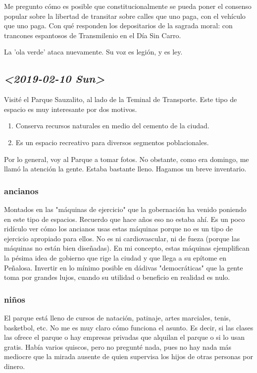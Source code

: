 \documentclass[11pt]{article}
\begin{document}
Me pregunto cómo es
posible que constitucionalmente se pueda poner el consenso popular sobre la libertad de transitar sobre calles que uno paga, con el vehículo 
que uno paga. Con qué responden los depositarios de la sagrada moral: con trancones espantosos de Transmilenio en el Día Sin Carro.

La 'ola verde' ataca nuevamente. Su voz es legión, y es ley.





\subsection{\textit{<2019-02-10 Sun>}}
\label{sec-2-3}
Visité el Parque Sauzalito, al lado de la Teminal de Transporte. Este tipo de espacio es muy interesante por dos motivos.
\begin{enumerate}
\item Conserva recursos naturales en medio del cemento de la ciudad.
\item Es un espacio recreativo para diversos segmentos poblacionales.
\end{enumerate}

Por lo general, voy al Parque a tomar fotos. No obstante, como era domingo, me llamó la atención la gente. Estaba bastante lleno.
Hagamos un breve inventario.

\subsubsection{ancianos}
\label{sec-2-3-1}

Montados en las "máquinas de ejercicio" que la gobernación ha venido
poniendo en este tipo de espacios. Recuerdo que hace años eso no estaba ahí. Es un poco ridículo ver 
cómo los ancianos usas estas máquinas porque no es un tipo de ejercicio apropiado para ellos. No es 
ni cardiovascular, ni de fueza (porque las máquinas no están bien diseñadas). En mi concepto, estas máquinas
ejemplifican la pésima idea de gobierno que rige la ciudad y que llega a su epítome en Peñalosa. Invertir en 
lo mínimo posible en dádivas "democráticas" que la gente toma por grandes lujos, cuando su utilidad o beneficio en 
realidad es nulo. 

\subsubsection{niños}
\label{sec-2-3-2}
El parque está lleno de cursos de natación, patinaje, artes marciales, tenis, basketbol, etc. No me es muy claro 
cómo funciona el asunto. Es decir, si las clases las ofrece el parque o hay empresas privadas que alquilan el parque o 
si lo usan gratis. Había varios quiscos, pero no pregunté nada, pues no hay nada más mediocre que la mirada ausente de quien
supervisa los hijos de otras personas por dinero. 
\end{document}
